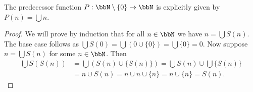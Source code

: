 \begin{lemma}
    The predecessor function $P:\bbN\setminus\{0\}\to\bbN$ is explicitly given by $P(n)=\bigcup n$.
\end{lemma}
\begin{proof}
    We will prove by induction that for all $n\in\bbN$ we have $n=\bigcup S(n)$. The base case follows as $\bigcup S(0)=\bigcup(0\cup\{0\})=\bigcup\{0\}=0$. Now suppose $n=\bigcup S(n)$ for some $n\in\bbN$. Then
    \begin{align*}
        \bigcup S(S(n)) & =\bigcup(S(n)\cup\{S(n)\})=\bigcup S(n)\cup\bigcup\{S(n)\} \\
        & =n\cup S(n)=n\cup n\cup\{n\}=n\cup\{n\}=S(n).
    \end{align*}
\end{proof}
